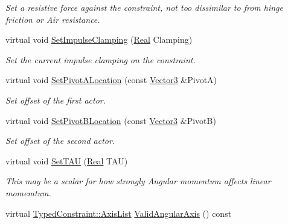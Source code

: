 \begin{DoxyCompactItemize}
\begin{DoxyCompactList}\small\item\em Set a resistive force against the constraint, not too dissimilar to from hinge friction or Air resistance. \item\end{DoxyCompactList}\item 
virtual void \hyperlink{classphys_1_1Point2PointConstraint_afd2be426f4a13b9512d964903a035551}{SetImpulseClamping} (\hyperlink{namespacephys_af7eb897198d265b8e868f45240230d5f}{Real} Clamping)
\begin{DoxyCompactList}\small\item\em Set the current impulse clamping on the constraint. \item\end{DoxyCompactList}\item 
virtual void \hyperlink{classphys_1_1Point2PointConstraint_ad1ffe9d877dd0601f76215bec56c1a4a}{SetPivotALocation} (const \hyperlink{classphys_1_1Vector3}{Vector3} \&PivotA)
\begin{DoxyCompactList}\small\item\em Set offset of the first actor. \item\end{DoxyCompactList}\item 
virtual void \hyperlink{classphys_1_1Point2PointConstraint_abb11fffed7284323321be9ff481268a4}{SetPivotBLocation} (const \hyperlink{classphys_1_1Vector3}{Vector3} \&PivotB)
\begin{DoxyCompactList}\small\item\em Set offset of the second actor. \item\end{DoxyCompactList}\item 
virtual void \hyperlink{classphys_1_1Point2PointConstraint_a556c4610b62c075efaa9d246cf3d2dc2}{SetTAU} (\hyperlink{namespacephys_af7eb897198d265b8e868f45240230d5f}{Real} TAU)
\begin{DoxyCompactList}\small\item\em This may be a scalar for how strongly Angular momentum affects linear momemtum. \item\end{DoxyCompactList}\item 
virtual \hyperlink{classphys_1_1TypedConstraint_a26261a4055e84e104c58d84eea5667c2}{TypedConstraint::AxisList} \hyperlink{classphys_1_1Point2PointConstraint_ab33ef9c2b99432247b4582cb829bb9dc}{ValidAngularAxis} () const 
\item 

\end{DoxyCompactItemize}

